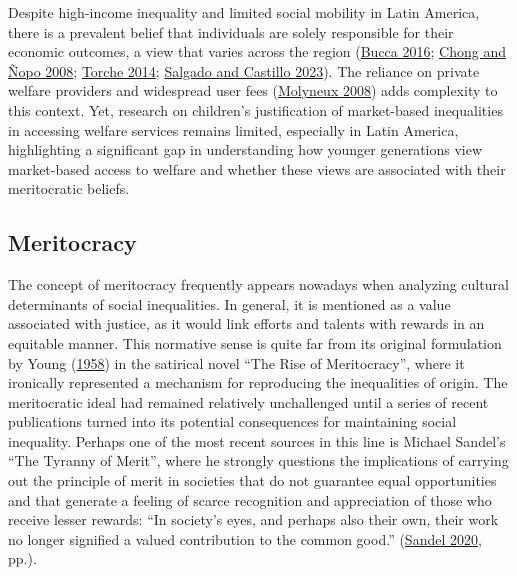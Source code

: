 \documentclass[
  letterpaper,
  DIV=11,
  numbers=noendperiod]{scrartcl}
\begin{document}
Despite high-income inequality and limited social mobility in Latin
America, there is a prevalent belief that individuals are solely
responsible for their economic outcomes, a view that varies across the
region (\protect\hyperlink{ref-bucca_merit_2016}{Bucca 2016};
\protect\hyperlink{ref-chong_mystery_2008}{Chong and Ñopo 2008};
\protect\hyperlink{ref-torche_intergenerational_2014}{Torche 2014};
\protect\hyperlink{ref-salgado_inequality_2023}{Salgado and Castillo
2023}). The reliance on private welfare providers and widespread user
fees (\protect\hyperlink{ref-molyneux_neoliberal_2008}{Molyneux 2008})
adds complexity to this context. Yet, research on children's
justification of market-based inequalities in accessing welfare services
remains limited, especially in Latin America, highlighting a significant
gap in understanding how younger generations view market-based access to
welfare and whether these views are associated with their meritocratic
beliefs.~

\hypertarget{meritocracy}{%
\subsection{Meritocracy}\label{meritocracy}}

The concept of meritocracy frequently appears nowadays when analyzing
cultural determinants of social inequalities. In general, it is
mentioned as a value associated with justice, as it would link efforts
and talents with rewards in an equitable manner. This normative sense is
quite far from its original formulation by Young
(\protect\hyperlink{ref-young_rise_1958}{1958}) in the satirical novel
``The Rise of Meritocracy'', where it ironically represented a mechanism
for reproducing the inequalities of origin. The meritocratic ideal had
remained relatively unchallenged until a series of recent publications
turned into its potential consequences for maintaining social
inequality. Perhaps one of the most recent sources in this line is
Michael Sandel's ``The Tyranny of Merit'', where he strongly questions
the implications of carrying out the principle of merit in societies
that do not guarantee equal opportunities and that generate a feeling of
scarce recognition and appreciation of those who receive lesser rewards:
``In society's eyes, and perhaps also their own, their work no longer
signified a valued contribution to the common good.''
(\protect\hyperlink{ref-sandel_tyranny_2020}{Sandel 2020}, pp.).
\end{document}

